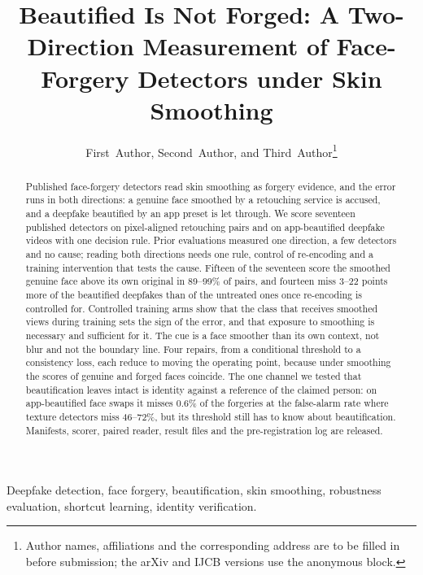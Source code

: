 \documentclass[journal]{IEEEtran}  %
\begin{document}
\title{Beautified Is Not Forged: A Two-Direction Measurement of Face-Forgery Detectors under Skin Smoothing}

\author{First~Author, Second~Author, and Third~Author\thanks{Author names, affiliations and the corresponding address are to be filled in before submission; the arXiv and IJCB versions use the anonymous block.}}

\maketitle

\begin{abstract}
Published face-forgery detectors read skin smoothing as forgery evidence, and the error runs in both directions: a genuine
face smoothed by a retouching service is accused, and a deepfake beautified by an app preset is let through. We score seventeen published detectors on pixel-aligned retouching pairs and on app-beautified deepfake videos with one decision rule. Prior evaluations measured one direction, a few detectors and no
cause; reading both directions needs one rule, control of re-encoding and a training intervention that tests the
cause. Fifteen of the seventeen score the smoothed genuine face above its own original
in 89--99\% of pairs,
and fourteen miss 3--22 points more of the beautified deepfakes than of the untreated ones once re-encoding is controlled for.
Controlled training arms show that the class that receives smoothed views during training
sets the sign of the error, and that exposure to smoothing is necessary and sufficient for it. The cue is a face smoother than
its own context, not blur and not the boundary line. Four repairs, from a conditional threshold to a consistency loss, each reduce to moving the operating point, because under smoothing the scores of genuine and forged faces coincide. The one channel we tested that beautification leaves intact is identity against a reference of the claimed person: on app-beautified face swaps it misses 0.6\% of the forgeries at the false-alarm rate where texture
detectors miss 46--72\%,
but its threshold still has to know about beautification. Manifests, scorer, paired reader, result files and the pre-registration log are released.
\end{abstract}
\begin{IEEEkeywords}
Deepfake detection, face forgery, beautification, skin smoothing, robustness evaluation, shortcut learning, identity verification.
\end{IEEEkeywords}
\end{document}
